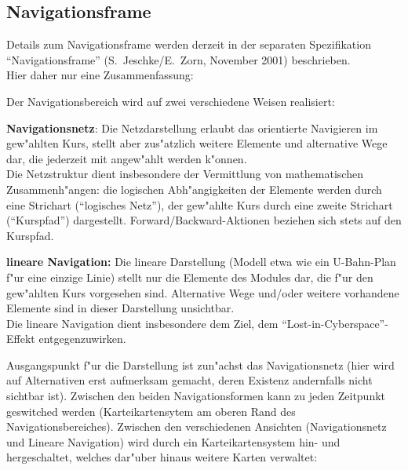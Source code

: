


\subsection{Navigationsframe}

Details zum Navigationsframe werden derzeit in der separaten Spezifikation
``Navigationsframe'' (S.~Jeschke/E.~Zorn, November 2001) beschrieben.\\
Hier daher nur eine Zusammenfassung:

Der Navigationsbereich wird auf zwei verschiedene Weisen realisiert:

\begin{list_sabina}
        \item \textbf{Navigationsnetz}: Die Netzdarstellung erlaubt das orientierte
          Navigieren im gew"ahlten Kurs, stellt aber zus"atzlich weitere
          Elemente und alternative Wege dar, die jederzeit mit angew"ahlt
          werden k"onnen. \\
          Die Netzstruktur dient insbesondere der Vermittlung von
          mathematischen Zusammenh"angen: die logischen Abh"angigkeiten der
          Elemente werden durch eine Strichart (``logisches Netz''), 
          der gew"ahlte Kurs durch eine zweite Strichart (``Kurspfad'')
          dargestellt. Forward/Backward-Aktionen beziehen sich stets
          auf den Kurspfad.
        \item \textbf{lineare Navigation:} Die lineare Darstellung (Modell
          etwa wie ein U-Bahn-Plan f"ur eine einzige Linie) stellt nur die
          Elemente des Modules dar, die f"ur den gew"ahlten Kurs vorgesehen
          sind. Alternative Wege und/oder weitere vorhandene Elemente sind in
          dieser Darstellung unsichtbar.\\
          Die lineare Navigation dient insbesondere dem Ziel, dem 
          ``Lost-in-Cyberspace''-Effekt entgegenzuwirken.
\end{list_sabina}


Ausgangspunkt f"ur die Darstellung ist zun"achst das Navigationsnetz (hier
wird auf Alternativen erst aufmerksam gemacht, deren Existenz andernfalls
nicht sichtbar ist). Zwischen den beiden Navigationsformen kann zu jeden
Zeitpunkt geswitched werden (Karteikartensytem am oberen Rand des
Navigationsbereiches).
Zwischen den verschiedenen Ansichten (Navigationsnetz und Lineare
Navigation) wird durch ein Karteikartensystem hin- und hergeschaltet,
welches dar"uber hinaus weitere Karten verwaltet:

